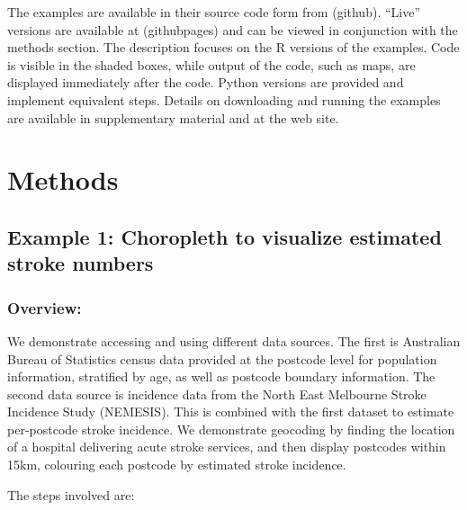 \documentclass[utf8]{frontiersHLTH}
\begin{document}
The examples are available in their source code form from (github).
``Live'' versions are available at (githubpages) and can be viewed in
conjunction with the methods section. The description focuses on the R
versions of the examples. Code is visible in the shaded boxes, while
output of the code, such as maps, are displayed immediately after the
code. Python versions are provided and implement equivalent steps.
Details on downloading and running the examples are available in
supplementary material and at the web site.

\section{Methods}\label{methods}

\subsection{Example 1: Choropleth to visualize estimated stroke
numbers}\label{example-1-choropleth-to-visualize-estimated-stroke-numbers}

\subsubsection{Overview:}\label{overview}

We demonstrate accessing and using different data sources. The first is
Australian Bureau of Statistics census data provided at the postcode
level for population information, stratified by age, as well as postcode
boundary information. The second data source is incidence data from the
North East Melbourne Stroke Incidence Study (NEMESIS)\cite{thrift_stroke_2000}. This is combined
with the first dataset to estimate per-postcode stroke incidence. We
demonstrate geocoding by finding the location of a hospital delivering
acute stroke services, and then display postcodes within 15km, colouring
each postcode by estimated stroke incidence.

The steps involved are:
\end{document}
